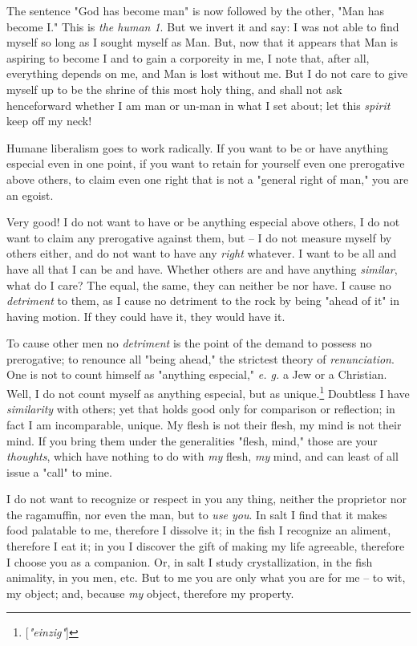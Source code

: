 The sentence "{}God has become man"{} is now followed by the other, "{}Man has 
become I."{} This is \textit{the human 1}. But we invert it and say: I was not 
able to find myself so long as I sought myself as Man. But, now that it 
appears that Man is aspiring to become I and to gain a corporeity in me, I 
note that, after all, everything depends on me, and Man is lost without me. 
But I do not care to give myself up to be the shrine of this most holy thing, 
and shall not ask henceforward whether I am man or un-man in what I set about; 
let this \textit{spirit} keep off my neck!

Humane liberalism goes to work radically. If you want to be or have anything 
especial even in one point, if you want to retain for yourself even one 
prerogative above others, to claim even one right that is not a "{}general 
right of man,"{} you are an egoist.

Very good! I do not want to have or be anything especial above others, I do 
not want to claim any prerogative against them, but -- I do not measure myself 
by others either, and do not want to have any \textit{right} whatever. I want 
to be all and have all that I can be and have. Whether others are and have 
anything \textit{similar}, what do I care? The equal, the same, they can 
neither be nor have. I cause no \textit{detriment} to them, as I cause no 
detriment to the rock by being "{}ahead of it"{} in having motion. If they 
could have it, they would have it.

To cause other men no \textit{detriment} is the point of the demand to possess 
no prerogative; to renounce all "{}being ahead,"{} the strictest theory of 
\textit{renunciation}. One is not to count himself as "{}anything especial,"{} 
\textit{e. g.} a Jew or a Christian. Well, I do not count myself as anything 
especial, but as unique.\footnote{[\textit{"{}einzig"{}}]} Doubtless I have 
\textit{similarity} with others; yet that holds good only for comparison or 
reflection; in fact I am incomparable, unique. My flesh is not their flesh, my 
mind is not their mind. If you bring them under the generalities "{}flesh, 
mind,"{} those are your \textit{thoughts}, which have nothing to do with 
\textit{my} flesh, \textit{my} mind, and can least of all issue a "{}call"{} 
to mine.

I do not want to recognize or respect in you any thing, neither the proprietor 
nor the ragamuffin, nor even the man, but to \textit{use you}. In salt I find 
that it makes food palatable to me, therefore I dissolve it; in the fish I 
recognize an aliment, therefore I eat it; in you I discover the gift of making 
my life agreeable, therefore I choose you as a companion. Or, in salt I study 
crystallization, in the fish animality, in you men, etc. But to me you are 
only what you are for me -- to wit, my object; and, because \textit{my} 
object, therefore my property.

